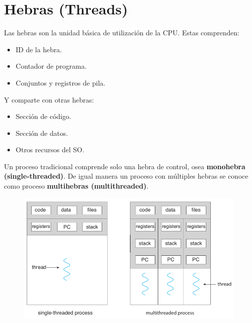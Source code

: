 \documentclass{templateNote}
\begin{document}
\newpage
\section{Hebras (Threads)}
Las hebras son la unidad básica de utilización de la CPU. Estas comprenden:
\begin{itemize}
    \item ID de la hebra.
    \item Contador de programa.
    \item Conjuntos y registros de pila.
\end{itemize}
Y comparte con otras hebras:
\begin{itemize}
    \item Sección de código.
    \item Sección de datos.
    \item Otros recursos del SO.
\end{itemize}
Un proceso tradicional comprende solo una hebra de control, osea \textbf{monohebra (single-threaded)}. 
De igual manera un proceso con múltiples hebras se conoce como proceso \textbf{multihebras (multithreaded)}.

\begin{figure}[H]
    \centering
    \includegraphics[width=\textwidth]{img/monomulti.png}
\end{figure}
\end{document}
